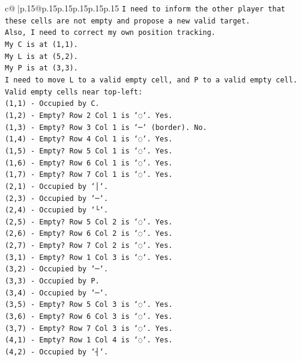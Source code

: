 \documentclass{article}
\begin{document}
{\begin{supertabular}{c@{$\;$}|p{.15\linewidth}@{}p{.15\linewidth}p{.15\linewidth}p{.15\linewidth}p{.15\linewidth}p{.15\linewidth}}
{{{\texttt{I need to inform the other player that these cells are not empty and propose a new valid target.} \\
\texttt{Also, I need to correct my own position tracking.} \\
\texttt{My C is at (1,1).} \\
\texttt{My L is at (5,2).} \\
\texttt{My P is at (3,3).} \\
\texttt{I need to move L to a valid empty cell, and P to a valid empty cell.} \\
\texttt{Valid empty cells near top{-}left:} \\
\texttt{(1,1) {-} Occupied by C.} \\
\texttt{(1,2) {-} Empty? Row 2 Col 1 is `◌`. Yes.} \\
\texttt{(1,3) {-} Empty? Row 3 Col 1 is `─` (border). No.} \\
\texttt{(1,4) {-} Empty? Row 4 Col 1 is `◌`. Yes.} \\
\texttt{(1,5) {-} Empty? Row 5 Col 1 is `◌`. Yes.} \\
\texttt{(1,6) {-} Empty? Row 6 Col 1 is `◌`. Yes.} \\
\texttt{(1,7) {-} Empty? Row 7 Col 1 is `◌`. Yes.} \\
\texttt{(2,1) {-} Occupied by `│`.} \\
\texttt{(2,3) {-} Occupied by `─`.} \\
\texttt{(2,4) {-} Occupied by `└`.} \\
\texttt{(2,5) {-} Empty? Row 5 Col 2 is `◌`. Yes.} \\
\texttt{(2,6) {-} Empty? Row 6 Col 2 is `◌`. Yes.} \\
\texttt{(2,7) {-} Empty? Row 7 Col 2 is `◌`. Yes.} \\
\texttt{(3,1) {-} Empty? Row 1 Col 3 is `◌`. Yes.} \\
\texttt{(3,2) {-} Occupied by `─`.} \\
\texttt{(3,3) {-} Occupied by P.} \\
\texttt{(3,4) {-} Occupied by `─`.} \\
\texttt{(3,5) {-} Empty? Row 5 Col 3 is `◌`. Yes.} \\
\texttt{(3,6) {-} Empty? Row 6 Col 3 is `◌`. Yes.} \\
\texttt{(3,7) {-} Empty? Row 7 Col 3 is `◌`. Yes.} \\
\texttt{(4,1) {-} Empty? Row 1 Col 4 is `◌`. Yes.} \\
\texttt{(4,2) {-} Occupied by `┤`.} \\
}}}
\end{supertabular}}
\end{document}
